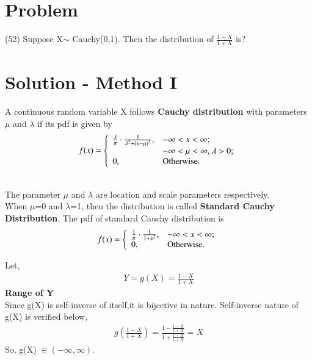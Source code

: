 \documentclass[journal,12pt,twocolumn]{IEEEtran}
\begin{document}
\section{Problem}
(52) Suppose X$\sim$ Cauchy(0,1). Then the distribution of
$\frac{1-X}{1+X}$ is?
\section{Solution - Method I}
A continuous random variable X follows \textbf{Cauchy distribution} with parameters $\mu$ and $\lambda$ if its pdf is given by
\\
    \begin{equation*} f(x) =\left\{ \begin{array}{ll} \frac{\lambda}{\pi}\cdot \frac{1}{\lambda^2+(x-\mu)^2}, & \hbox{$-\infty < x< \infty$;} \\ & \hbox{$-\infty < \mu< \infty$, $\lambda>0$;} \\ 0, & \hbox{Otherwise.} \end{array} \right. \end{equation*}
    
\\
The parameter $\mu$ and $\lambda$ are location and scale parameters respectively. 
\\
When $\mu$=0 and $\lambda$=1, then the distribution is called \textbf{Standard Cauchy Distribution}. The pdf of standard Cauchy distribution is
\\
\begin{equation*} f(x) =\left\{ \begin{array}{ll} \frac{1}{\pi}\cdot \frac{1}{1+x^2}, & \hbox{$-\infty < x< \infty$;} \\ 0, & \hbox{Otherwise.} \end{array} \right. \end{equation*}

Let,
\begin{align}
    Y = g(X) = \frac{1-X}{1+X}
\end{align}
\textbf{Range of Y} \\
Since g(X) is self-inverse of itself,it is bijective in nature. Self-inverse nature of g(X) is verified below,
\begin{align}
    g\left(\frac{1-X}{1+X}\right) = \frac{1-\frac{1-X}{1+X}}{1+\frac{1-X}{1+X}}
    = X
\end{align}
So, g(X) $\in (-\infty,\infty)$. \\
\\
\end{document}
